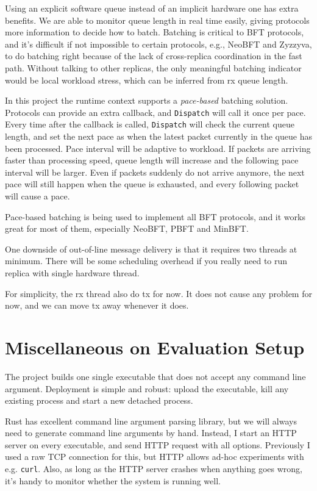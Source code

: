 \documentclass[acmsmall, nonacm, screen]{acmart}
\newcommand{\editorial}[2]{{\color{#1}{#2}}\xspace}
\newcommand{\sgd}[1]{\editorial{cyan}{sgd: #1}}
\begin{document}
Using an explicit software queue instead of an implicit hardware one has extra benefits.
We are able to monitor queue length in real time easily, giving protocols more information to decide how to batch.
Batching is critical to BFT protocols, and it's difficult if not impossible to certain protocols, e.g., NeoBFT and Zyzzyva, to do batching right because of the lack of cross-replica coordination in the fast path.
Without talking to other replicas, the only meaningful batching indicator would be local workload stress, which can be inferred from rx queue length.

In this project the runtime context supports a \emph{pace-based} batching solution.
Protocols can provide an extra callback, and \texttt{Dispatch} will call it once per pace.
Every time after the callback is called, \texttt{Dispatch} will check the current queue length, and set the next pace as when the latest packet currently in the queue has been processed.
Pace interval will be adaptive to workload.
If packets are arriving faster than processing speed, queue length will increase and the following pace interval will be larger.
Even if packets suddenly do not arrive anymore, the next pace will still happen when the queue is exhausted, and every following packet will cause a pace.
\sgd{Try to show some formula.}

Pace-based batching is being used to implement all BFT protocols, and it works great for most of them, especially NeoBFT, PBFT and MinBFT.

One downside of out-of-line message delivery is that it requires two threads at minimum.
There will be some scheduling overhead if you really need to run replica with single hardware thread.

For simplicity, the rx thread also do tx for now.
It does not cause any problem for now, and we can move tx away whenever it does.

\section{Miscellaneous on Evaluation Setup}

The project builds one single executable that does not accept any command line argument.
Deployment is simple and robust: upload the executable, kill any existing process and start a new detached process.

Rust has excellent command line argument parsing library, but we will always need to generate command line arguments by hand.
Instead, I start an HTTP server on every executable, and send HTTP request with all options.
Previously I used a raw TCP connection for this, but HTTP allows ad-hoc experiments with e.g. \texttt{curl}.
Also, as long as the HTTP server crashes when anything goes wrong, it's handy to monitor whether the system is running well.
\end{document}
